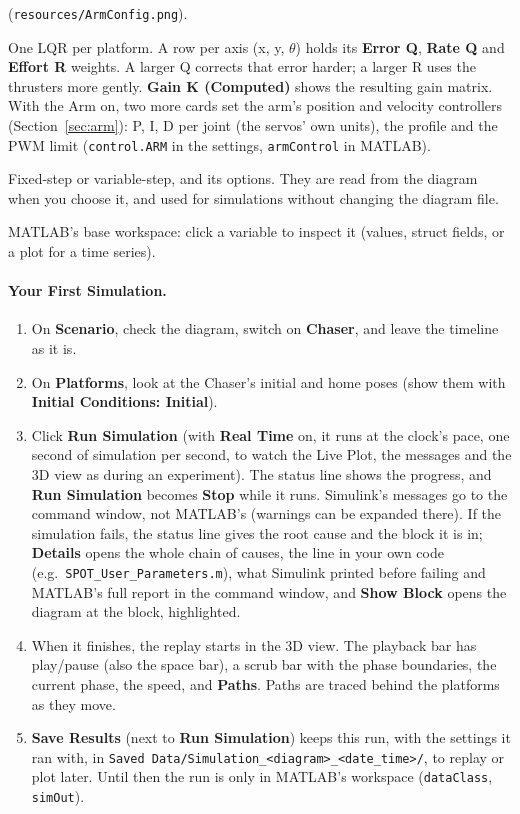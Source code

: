 \documentclass[11pt,a4paper]{article}
\newcommand{\ui}[1]{\textsf{\textbf{#1}}}
\newcommand{\pth}[1]{\texttt{#1}}
\newcommand{\fn}[1]{\texttt{#1}}
\begin{document}
\begin{description}[leftmargin=1em]
\begin{itemize}
            (\pth{resources/ArmConfig.png}).
    \end{itemize}
  \item[Control.] One LQR per platform. A row per axis (x, y, $\theta$) holds its \ui{Error Q}, \ui{Rate Q} and
        \ui{Effort R} weights. A larger Q corrects that error harder; a larger R uses the thrusters more gently.
        \ui{Gain K (Computed)} shows the resulting gain matrix. With the Arm on, two more cards set the arm's
        position and velocity controllers (Section~\ref{sec:arm}): P, I, D per joint (the servos' own units),
        the profile and the PWM limit (\texttt{control.ARM} in the settings, \texttt{armControl} in MATLAB).
  \item[Solver.] Fixed-step or variable-step, and its options. They are read from the diagram when you choose it, and
        used for simulations without changing the diagram file.
  \item[Workspace.] MATLAB's base workspace: click a variable to inspect it (values, struct fields, or a plot for a
        time series).
\end{description}

\paragraph{Your First Simulation.}
\begin{enumerate}
  \item On \ui{Scenario}, check the diagram, switch on \ui{Chaser}, and leave the timeline as it is.
  \item On \ui{Platforms}, look at the Chaser's initial and home poses (show them with \ui{Initial Conditions: Initial}).
  \item Click \ui{Run Simulation} (with \ui{Real Time} on, it runs at the clock's pace, one second of simulation per
        second, to watch the Live Plot, the messages and the 3D view as during an experiment). The status line shows the progress, and \ui{Run Simulation} becomes \ui{Stop}
        while it runs. Simulink's messages go to the command window, not MATLAB's (warnings can be expanded there).
        If the simulation fails, the status line gives the root cause and the block it is in; \ui{Details} opens the
        whole chain of causes, the line in your own code (e.g.\ \pth{SPOT\_User\_Parameters.m}), what Simulink printed
        before failing and MATLAB's full report in the command window, and \ui{Show Block} opens the diagram at the
        block, highlighted.
  \item When it finishes, the replay starts in the 3D view. The playback bar has play/pause (also the space bar),
        a scrub bar with the phase boundaries, the current phase, the speed, and \ui{Paths}. Paths are traced behind
        the platforms as they move.
  \item \ui{Save Results} (next to \ui{Run Simulation}) keeps this run, with the settings it ran with, in
        \pth{Saved Data/Simulation\_<diagram>\_<date\_time>/}, to replay or plot later.
        Until then the run is only in MATLAB's workspace (\fn{dataClass}, \fn{simOut}).
\end{enumerate}
\end{document}
